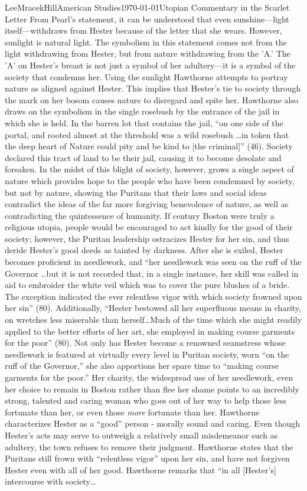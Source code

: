 \documentclass[12pt, letterpaper]{article}
\begin{document}
\begin{mla}{Lee}{Mracek}{Hill}{American Studies}{\today}{Utopian Commentary in the Scarlet Letter}
        From Pearl's statement, it can be understood that even sunshine---light itself---withdraws from Hester because of the letter that she wears. However, sunlight is natural light. The symbolism in this statement comes not from the light withdrawing from Hester, but from nature withdrawing from the 'A.' The 'A' on Hester's breast is not just a symbol of her adultery---it is a symbol of the society that condemns her. Using the sunlight Hawthorne attempts to portray nature as aligned against Hester. This implies that Hester's tie to society through the mark on her bosom causes nature to disregard and spite her. Hawthorne also draws on the symbolism in the single rosebush by the entrance of the jail in which she is held. In the barren lot that contains the jail, ``on one side of the portal, and rooted almost at the threshold was a wild rosebush \ldots in token that the deep heart of Nature could pity and be kind to [the criminal]'' (46). Society declared this tract of land to be their jail, causing it to become desolate and forsaken. In the midst of this blight of society, however, grows a single aspect of nature which provides hope to the people who have been condemned by society, but not by nature, showing the Puritans that their laws and social ideas contradict the ideas of the far more forgiving benevolence of nature, as well as contradicting the quintessence of humanity. If  century Boston were truly a religious utopia, people would be encouraged to act kindly for the good of their society; however, the Puritan leadership ostracizes Hester for her sin, and thus deride Hester's good deeds as tainted by darkness. After she is exiled, Hester becomes proficient in needlework, and ``her needlework was seen on the ruff of the Governor \ldots but it is not recorded that, in a single instance, her skill was called in aid to embroider the white veil which was to cover the pure blushes of a bride. The exception indicated the ever relentless vigor with which society frowned upon her sin'' (80). Additionally, ``Hester bestowed all her superfluous means in charity, on wretches less miserable than herself\ldots Much of the time which she might readily applied to the 
        better efforts of her art, she employed in making course garments for the poor'' (80). Not only has Hester become a renowned seamstress whose needlework is featured at virtually every level in Puritan society, worn ``on the ruff of the Governor,'' she also apportions her spare time to ``making course garments for the poor.'' Her charity, the widespread use of her needlework, even her choice to remain in Boston rather than flee her shame points to an incredibly strong, talented and caring woman who goes out of her way to help those less fortunate than her, or even those \textit{more} fortunate than her. Hawthorne characterizes Hester as a ``good'' person - morally sound and caring. Even though Hester's acts may serve to outweigh a relatively small misdemeanor such as adultery, the town refuses to remove their judgment. Hawthorne states that the Puritans still frown with ``relentless vigor'' upon her sin, and have not forgiven Hester even with all of her good. Hawthorne remarks that ``in all [Hester's] intercourse with society\ldots 

\end{mla}
\end{document}
